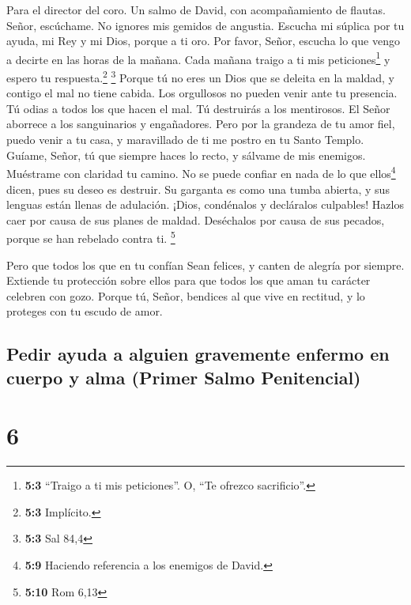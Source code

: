 Para el director del coro. Un salmo de David, con acompañamiento de
flautas.  Señor, escúchame. No ignores mis gemidos de
angustia.  Escucha mi súplica por tu ayuda, mi Rey y mi
Dios, porque a ti oro.  Por favor, Señor, escucha lo que
vengo a decirte en las horas de la mañana. Cada mañana traigo a ti mis
peticiones\footnote{\textbf{5:3} ``Traigo a ti mis peticiones''. O, ``Te
  ofrezco sacrificio''.} y espero tu respuesta.\footnote{\textbf{5:3}
  Implícito.} \footnote{\textbf{5:3} Sal 84,4}  Porque tú
no eres un Dios que se deleita en la maldad, y contigo el mal no tiene
cabida.  Los orgullosos no pueden venir ante tu presencia.
Tú odias a todos los que hacen el mal.  Tú destruirás a
los mentirosos. El Señor aborrece a los sanguinarios y engañadores.
 Pero por la grandeza de tu amor fiel, puedo venir a tu
casa, y maravillado de ti me postro en tu Santo Templo. 
Guíame, Señor, tú que siempre haces lo recto, y sálvame de mis enemigos.
Muéstrame con claridad tu camino.  No se puede confiar en
nada de lo que ellos\footnote{\textbf{5:9} Haciendo referencia a los
  enemigos de David.} dicen, pues su deseo es destruir. Su garganta es
como una tumba abierta, y sus lenguas están llenas de adulación.
 ¡Dios, condénalos y decláralos culpables! Hazlos caer
por causa de sus planes de maldad. Deséchalos por causa de sus pecados,
porque se han rebelado contra ti. \footnote{\textbf{5:10} Rom 6,13}

 Pero que todos los que en tu confían Sean felices, y
canten de alegría por siempre. Extiende tu protección sobre ellos para
que todos los que aman tu carácter celebren con gozo. 
Porque tú, Señor, bendices al que vive en rectitud, y lo proteges con tu
escudo de amor.

\hypertarget{pedir-ayuda-a-alguien-gravemente-enfermo-en-cuerpo-y-alma-primer-salmo-penitencial}{%
\subsection{Pedir ayuda a alguien gravemente enfermo en cuerpo y alma
(Primer Salmo
Penitencial)}\label{pedir-ayuda-a-alguien-gravemente-enfermo-en-cuerpo-y-alma-primer-salmo-penitencial}}

\hypertarget{section-5}{%
\section{6}\label{section-5}}

